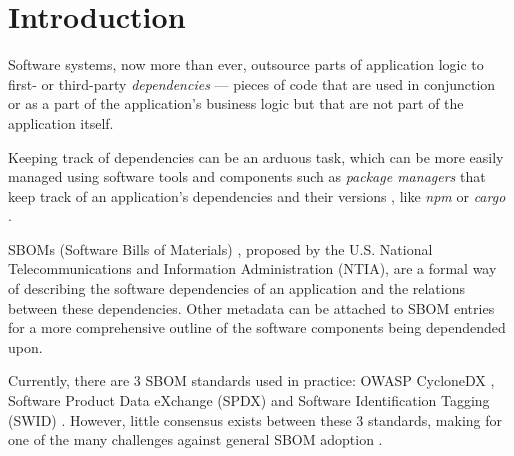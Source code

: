 \section{Introduction}

Software systems, now more than ever, outsource parts of application logic to first- or third-party \emph{dependencies} --- pieces of code that are used in conjunction or as a part of the application's business logic but that are not part of the application itself.

\noindent Keeping track of dependencies can be an arduous task, which can be more easily managed using software tools and components such as \emph{package managers} that keep track of an application's dependencies and their versions \cite{article:package-manager}, like \emph{npm} or \emph{cargo} \cite{tools:pkg-mngr:npm,tools:pkg-mngr:cargo}.

\noindent SBOMs (Software Bills of Materials) \cite{article:concept:sbom-2}, proposed by the U.S. National Telecommunications and Information Administration (NTIA), are a formal way of describing the software dependencies of an application and the relations between these dependencies. Other metadata can be attached to SBOM entries for a more comprehensive outline of the software components being dependended upon.

\noindent Currently, there are 3 SBOM standards used in practice: OWASP CycloneDX \cite{standards:sbom:cyclonedx}, Software Product Data eXchange (SPDX) \cite{standards:sbom:spdx} and Software Identification Tagging (SWID) \cite{standards:sbom:swid}. However, little consensus exists between these 3 standards, making for one of the many challenges against general SBOM adoption \cite{article:sbom-study}.

